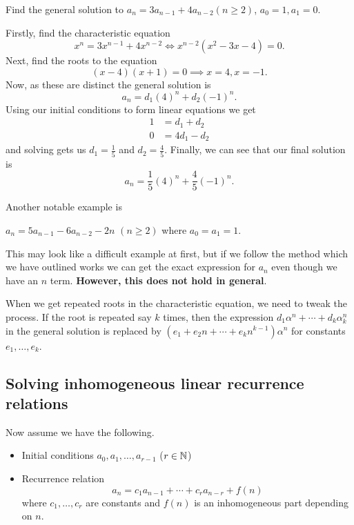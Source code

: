 \documentclass[10pt, a4paper]{article}
\begin{document}
\begin{example}
    Find the general solution to $a_{n} = 3a_{n - 1} + 4a_{n - 2} (n \geq 2)$, $a_0 = 1, a_1 = 0$.

    Firstly,
    find the characteristic equation
    \[
    x ^ n = 3x ^ {n - 1} + 4x ^ {n - 2} \iff x ^ {n - 2}(x ^ 2 - 3x - 4) = 0.
    \]
    Next,
    find the roots to the equation
    \[
    (x - 4)(x + 1) = 0 \implies x = 4, x = -1.
    \]
    Now,
    as these are distinct the general solution is
    \[
    a_n = d_1(4) ^ n + d_2(-1) ^ n.
    \]
    Using our initial conditions to form linear equations we get
    \begin{align*}
        1 &= d_1 + d_2 \\
        0 &= 4d_1 - d_2
    \end{align*}
    and solving gets us $d_1 = \frac{1}{5}$ and $d_2 = \frac{4}{5}$.
    Finally,
    we can see that our final solution is
    \[
    a_n = \frac{1}{5}(4) ^ n + \frac{4}{5}(-1) ^ n.
    \]
\end{example}

Another notable example is
\begin{example}
    $a_n = 5a_{n - 1} - 6a_{n - 2} - 2n$ $(n \geq 2)$ where $a_0 = a_1 = 1$.
\end{example}
This may look like a difficult example at first,
but if we follow the method which we have outlined works we can get the exact expression for $a_n$ even though we have an $n$ term.
\textbf{However, this does not hold in general}.

When we get repeated roots in the characteristic equation,
we need to tweak the process.
If the root is repeated say $k$ times,
then the expression $d_1\alpha ^ n + \dotsi + d_k\alpha_k ^ n$ in the general solution is replaced by $(e_1 + e_2n + \dotsi + e_kn ^ {k - 1})\alpha ^ n$ for constants $e_1, \dotsc, e_k$.

\subsection{Solving inhomogeneous linear recurrence relations}
Now assume we have the following.
\begin{itemize}
    \item Initial conditions $a_0, a_1, \dotsc, a_{r - 1}$ ($r \in \mathbb{N}$)
    \item Recurrence relation
    \[
    a_n = c_1a_{n - 1} + \dotsi + c_ra_{n - r} + f(n)
    \]
    where $c_1, \dotsc, c_r$ are constants and $f(n)$ is an inhomogeneous part depending on $n$.
\end{itemize}
\end{document}

